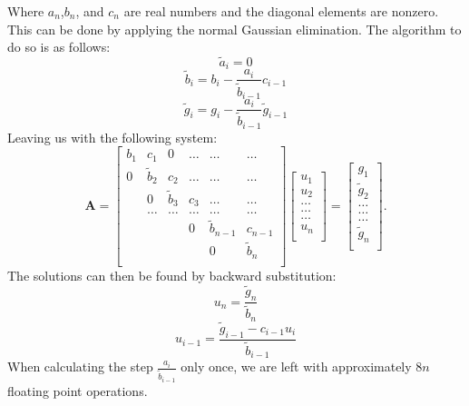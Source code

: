 \documentclass[10pt,a4paper]{article}
\begin{document}
Where $a_n$,$b_n$, and $c_n$ are real numbers and the diagonal elements are nonzero.\\
This can be done by applying the normal Gaussian elimination. The algorithm to do so is as follows:
$$\tilde{a}_i = 0$$
$$\tilde{b}_i=b_i-\frac{a_i}{\tilde{b}_{i-1}} c_{i-1}$$
$$\tilde{g}_i=g_i-\frac{a_i}{\tilde{b}_{i-1}} \tilde{g}_{i-1}$$
Leaving us with the following system:
\[
    \mathbf{A} = \begin{bmatrix}
                           b_1& c_1 & 0 &\dots   & \dots &\dots \\
                           0& \tilde{b}_{2} & c_2 &\dots &\dots &\dots \\
                           & 0 & \tilde{b}_{3} & c_3 & \dots & \dots \\
                           & \dots   & \dots &\dots   &\dots & \dots \\
                           &   &  & 0  &\tilde{b}_{n-1}& c_{n-1} \\
		      &    &  &   &0 &\tilde{b}_n  \\
                      \end{bmatrix}\begin{bmatrix}
                           u_1\\
                           u_2\\
                           \dots \\
                          \dots  \\
                          \dots \\
                           u_n\\
                      \end{bmatrix}
  =\begin{bmatrix}
                           g_1\\
                           \tilde{g}_2\\
                           \dots \\
                           \dots \\
                          \dots \\
                           \tilde{g}_n\\
                      \end{bmatrix}.
\]
The solutions can then be found by backward substitution: 
$$u_n = \frac{\tilde{g}_n}{\tilde{b}_n}$$
$$u_{i-1} = \frac{\tilde{g}_{i-1}-c_{i-1} u_i}{\tilde{b}_{i-1}}$$
When calculating the step $\frac{a_i}{\tilde{b}_{i-1}}$ only once, we are left with approximately $8n$ floating point operations.
\end{document}
